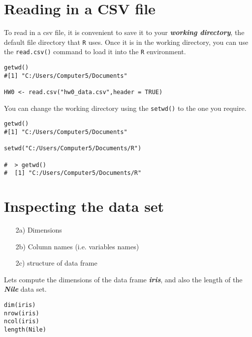 \documentclass[a4paper,12pt]{article}
\begin{document}
 
\section{Reading in a CSV file}
To read in a csv file, it is convenient to save it to your \textit{\textbf{working directory}}, the default file directory that \texttt{R} uses. Once it is in the working directory, you can use the \texttt{read.csv()} command to load it into the \texttt{R} environment.
\begin{framed}
\begin{verbatim}
getwd()
#[1] "C:/Users/Computer5/Documents"

HW0 <- read.csv("hw0_data.csv",header = TRUE)
\end{verbatim}
\end{framed}
You can change the working directory using the \texttt{setwd()} to the one you require.
\begin{framed}
\begin{verbatim}
getwd()
#[1] "C:/Users/Computer5/Documents"

setwd("C:/Users/Computer5/Documents/R")

#  > getwd()
#  [1] "C:/Users/Computer5/Documents/R"
\end{verbatim}
\end{framed}




\section{Inspecting the data set}

\begin{itemize}
\item[2a)] Dimensions
\item[2b)] Column names (i.e. variables names)
\item[2c)] structure of data frame
\end{itemize}
Lets compute the dimensions of the data frame \textit{\textbf{iris}}, and also the length of the \textit{\textbf{Nile}} data set.
\begin{framed}
\begin{verbatim}
dim(iris)
nrow(iris)
ncol(iris)
length(Nile)
\end{verbatim}
\end{framed}
\end{document}
